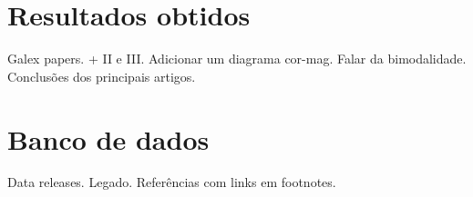 \section{Resultados obtidos}
\label{sec:Galex:Resultados}

Galex papers. \cite{Wyder2007} + II e III. Adicionar um diagrama cor-mag. Falar
da bimodalidade. Conclusões dos principais artigos.


\section{Banco de dados}
\label{sec:Galex:BancoDeDados}

Data releases. Legado. Referências com links em footnotes.

